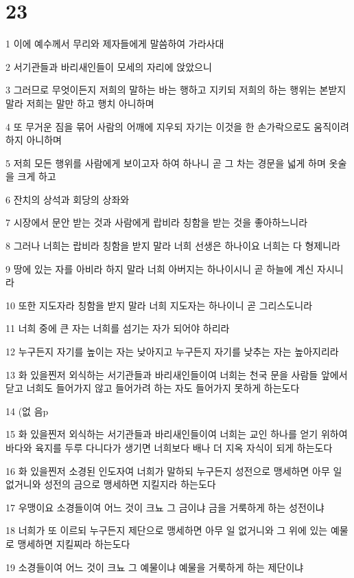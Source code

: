 \chapter{23}

\par 1 이에 예수께서 무리와 제자들에게 말씀하여 가라사대
\par 2 서기관들과 바리새인들이 모세의 자리에 앉았으니
\par 3 그러므로 무엇이든지 저희의 말하는 바는 행하고 지키되 저희의 하는 행위는 본받지 말라 저희는 말만 하고 행치 아니하며
\par 4 또 무거운 짐을 묶어 사람의 어깨에 지우되 자기는 이것을 한 손가락으로도 움직이려 하지 아니하며
\par 5 저희 모든 행위를 사람에게 보이고자 하여 하나니 곧 그 차는 경문을 넓게 하며 옷술을 크게 하고
\par 6 잔치의 상석과 회당의 상좌와
\par 7 시장에서 문안 받는 것과 사람에게 랍비라 칭함을 받는 것을 좋아하느니라
\par 8 그러나 너희는 랍비라 칭함을 받지 말라 너희 선생은 하나이요 너희는 다 형제니라
\par 9 땅에 있는 자를 아비라 하지 말라 너희 아버지는 하나이시니 곧 하늘에 계신 자시니라
\par 10 또한 지도자라 칭함을 받지 말라 너희 지도자는 하나이니 곧 그리스도니라
\par 11 너희 중에 큰 자는 너희를 섬기는 자가 되어야 하리라
\par 12 누구든지 자기를 높이는 자는 낮아지고 누구든지 자기를 낮추는 자는 높아지리라
\par 13 화 있을찐저 외식하는 서기관들과 바리새인들이여 너희는 천국 문을 사람들 앞에서 닫고 너희도 들어가지 않고 들어가려 하는 자도 들어가지 못하게 하는도다
\par 14 (없 음p
\par 15 화 있을찐저 외식하는 서기관들과 바리새인들이여 너희는 교인 하나를 얻기 위하여 바다와 육지를 두루 다니다가 생기면 너희보다 배나 더 지옥 자식이 되게 하는도다
\par 16 화 있을찐저 소경된 인도자여 너희가 말하되 누구든지 성전으로 맹세하면 아무 일 없거니와 성전의 금으로 맹세하면 지킬지라 하는도다
\par 17 우맹이요 소경들이여 어느 것이 크뇨 그 금이냐 금을 거룩하게 하는 성전이냐
\par 18 너희가 또 이르되 누구든지 제단으로 맹세하면 아무 일 없거니와 그 위에 있는 예물로 맹세하면 지킬찌라 하는도다
\par 19 소경들이여 어느 것이 크뇨 그 예물이냐 예물을 거룩하게 하는 제단이냐
